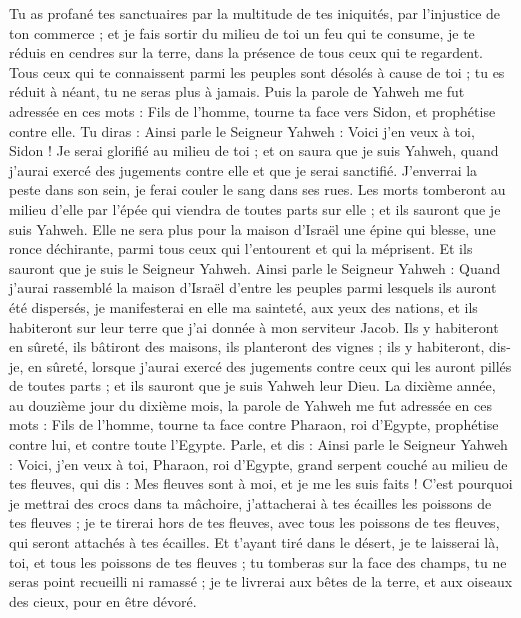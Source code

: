 \begin{multicols}{2}
Tu as profané tes sanctuaires par la multitude de tes iniquités, par l’injustice de ton commerce ; et je fais sortir du milieu de toi un feu qui te consume, je te réduis en cendres sur la terre, dans la présence de tous ceux qui te regardent.
Tous ceux qui te connaissent parmi les peuples sont désolés à cause de toi ; tu es réduit à néant, tu ne seras plus à jamais.
Puis la parole de Yahweh me fut adressée en ces mots :
Fils de l’homme, tourne ta face vers Sidon, et prophétise contre elle.
Tu diras : Ainsi parle le Seigneur Yahweh : Voici j'en veux à toi, Sidon ! Je serai glorifié au milieu de toi ; et on saura que je suis Yahweh, quand j'aurai exercé des jugements contre elle et que je serai sanctifié.
J'enverrai la peste dans son sein, je ferai couler le sang dans ses rues. Les morts tomberont au milieu d'elle par l'épée qui viendra de toutes parts sur elle ; et ils sauront que je suis Yahweh.
Elle ne sera plus pour la maison d’Israël une épine qui blesse, une ronce déchirante, parmi tous ceux qui l’entourent et qui la méprisent. Et ils sauront que je suis le Seigneur Yahweh.
Ainsi parle le Seigneur Yahweh : Quand j'aurai rassemblé la maison d'Israël d'entre les peuples parmi lesquels ils auront été dispersés, je manifesterai en elle ma sainteté, aux yeux des nations, et ils habiteront sur leur terre que j'ai donnée à mon serviteur Jacob.
Ils y habiteront en sûreté, ils bâtiront des maisons, ils planteront des vignes ; ils y habiteront, dis-je, en sûreté, lorsque j'aurai exercé des jugements contre ceux qui les auront pillés de toutes parts ; et ils sauront que je suis Yahweh leur Dieu.
\VerseOne{}La dixième année, au douzième jour du dixième mois, la parole de Yahweh me fut adressée en ces mots :
Fils de l’homme, tourne ta face contre Pharaon, roi d'Egypte, prophétise contre lui, et contre toute l'Egypte\FTNT{}.
Parle, et dis : Ainsi parle le Seigneur Yahweh : Voici, j'en veux à toi, Pharaon, roi d'Egypte, grand serpent couché au milieu de tes fleuves, qui dis : Mes fleuves sont à moi, et je me les suis faits\FTNT{} !
C'est pourquoi je mettrai des crocs dans ta mâchoire, j’attacherai à tes écailles les poissons de tes fleuves ; je te tirerai hors de tes fleuves, avec tous les poissons de tes fleuves, qui seront attachés à tes écailles.
Et t'ayant tiré dans le désert, je te laisserai là, toi, et tous les poissons de tes fleuves ; tu tomberas sur la face des champs, tu ne seras point recueilli ni ramassé ; je te livrerai aux bêtes de la terre, et aux oiseaux des cieux, pour en être dévoré.

\end{multicols}
